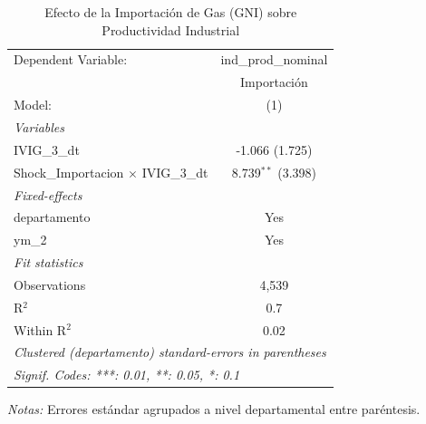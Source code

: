 \documentclass[12pt]{article}
\begin{document}
\setcounter{table}{11}
\begin{table}[htbp]
\centering
\begin{threeparttable}

   \caption{Efecto de la Importación de Gas (GNI) sobre Productividad Industrial}
   \centering
   \small
   \begin{tabular}{lc}
      \tabularnewline \midrule \midrule
      Dependent Variable:                         & ind\_prod\_nominal\\    
                                                  & Importación \\   
      Model:                                      & (1)\\  
      \midrule
      \emph{Variables}\\
      IVIG\_3\_dt                                 & -1.066 (1.725)\\   
      Shock\_Importacion $\times$ IVIG\_3\_dt     & 8.739$^{**}$ (3.398)\\   
      \midrule
      \emph{Fixed-effects}\\
      departamento                                & Yes\\  
      ym\_2                                       & Yes\\  
      \midrule
      \emph{Fit statistics}\\
      Observations                                & 4,539\\  
      R$^2$                                       & 0.7\\  
      Within R$^2$                                & 0.02\\  
      \midrule \midrule
      \multicolumn{2}{l}{\emph{Clustered (departamento) standard-errors in parentheses}}\\
      \multicolumn{2}{l}{\emph{Signif. Codes: ***: 0.01, **: 0.05, *: 0.1}}\\
   \end{tabular}


\begin{tablenotes}
\footnotesize
\item \textit{Notas:} Errores estándar agrupados a nivel departamental entre paréntesis.
\end{tablenotes}
\end{threeparttable}
\end{table}
\end{document}
